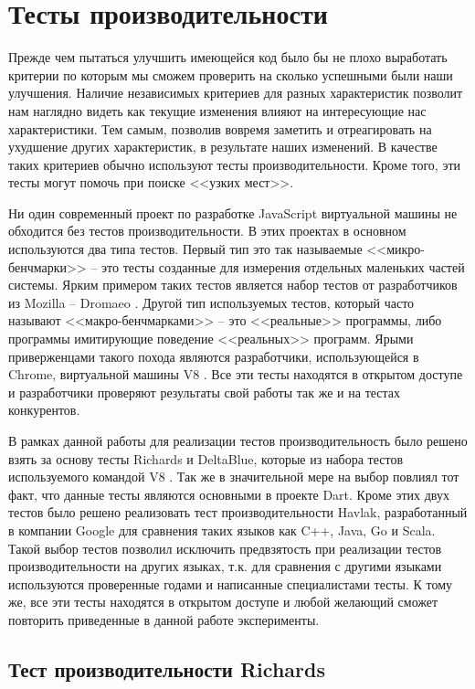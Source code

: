 \chapter{Тесты производительности}

Прежде чем пытаться улучшить имеющейся код было бы не плохо выработать критерии по которым мы сможем проверить на сколько успешными были наши улучшения. Наличие независимых критериев для разных характеристик позволит нам наглядно видеть как текущие изменения влияют на интересующие нас характеристики. Тем самым, позволив вовремя заметить и отреагировать на ухудшение других характеристик, в результате наших изменений.
В качестве таких критериев обычно используют тесты производительности. Кроме того, эти тесты могут помочь при поиске <<узких мест>>.

Ни один современный проект по разработке JavaScript виртуальной машины не обходится без тестов производительности. В этих проектах в основном используются два типа тестов. Первый тип это так называемые <<микро-бенчмарки>> -- это тесты созданные для измерения отдельных маленьких частей системы. Ярким примером таких тестов является набор тестов от разработчиков из Mozilla -- Dromaeo \cite{Dromaeo}.  Другой тип используемых тестов, который часто называют <<макро-бенчмарками>> -- это <<реальные>> программы, либо программы имитирующие поведение <<реальных>> программ. Ярыми приверженцами такого похода являются разработчики, использующейся в Chrome, виртуальной машины V8 \cite{V8:Benchmarks, Octane}. Все эти тесты находятся в открытом доступе и разработчики проверяют результаты свой работы так же и на тестах конкурентов.

В рамках данной работы для реализации тестов производительность было решено взять за основу тесты Richards и DeltaBlue, которые из набора тестов используемого командой V8 \cite{V8:Benchmarks}. Так же в значительной мере на выбор повлиял тот факт, что данные тесты являются основными в проекте Dart.
Кроме этих двух тестов было решено реализовать тест производительности Havlak, разработанный в компании Google для сравнения таких языков как C++, Java, Go и Scala.
Такой выбор тестов позволил исключить предвзятость при реализации тестов производительности на других языках, т.к. для сравнения с другими языками используются проверенные годами и написанные специалистами тесты. К тому же, все эти тесты находятся в открытом доступе и любой желающий сможет повторить приведенные в данной работе эксперименты.

\section{Тест производительности Richards}

